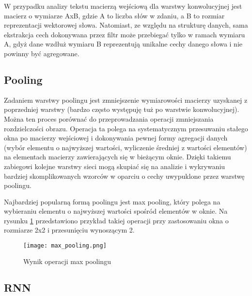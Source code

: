 W przypadku analizy tekstu macierzą wejściową dla warstwy konwolucyjnej jest macierz o wymiarze AxB, gdzie A to liczba słów w zdaniu, a B to rozmiar reprezentacji wektorowej słowa. Natomiast, ze względu na strukturę danych, sama ekstrakcja cech dokonywana przez filtr może przebiegać tylko w ramach wymiaru A, gdyż dane wzdłuż wymiaru B reprezentują unikalne cechy danego słowa i nie powinny być agregowane\cite{cnn_3}.


\subsection{Pooling}



Zadaniem warstwy poolingu jest zmniejszenie wymiarowości macierzy uzyskanej z poprzedniej warstwy (bardzo często występuję tuż po warstwie konwolucyjnej). Można ten proces porównać do przeprowadzania operacji zmniejszania rozdzielczości obrazu. Operacja ta polega na systematycznym przesuwaniu stałego okna po macierzy wejściowej i dokonywania pewnej formy agregacji danych (wybór elementu o najwyższej wartości, wyliczenie średniej z wartości elementów) na elementach macierzy zawierających się w bieżącym oknie. Dzięki takiemu zabiegowi kolejne warstwy sieci mogą skupiać się na analizie i wykrywaniu bardziej skomplikowanych wzorców w oparciu o cechy uwypuklone przez warstwę poolingu. \cite{pooling_1} \cite{pooling_2}

 

Najbardziej popularną formą poolingu jest max pooling, który polega na wybieraniu elementu o najwyższej wartości spośród elementów w oknie. Na rysunku \ref{fig:max_pooling} przedstawiono przykład takiej operacji przy zastosowaniu okna o rozmiarze 2x2 i przesunięciu wynoszącym 2. 

\begin{figure}[!h]
    \centering \texttt{[image: max\_pooling.png]}
    \caption{Wynik operacji max poolingu\cite{pooling_2}}
    \label{fig:max_pooling}
\end{figure}


\subsection{RNN}


